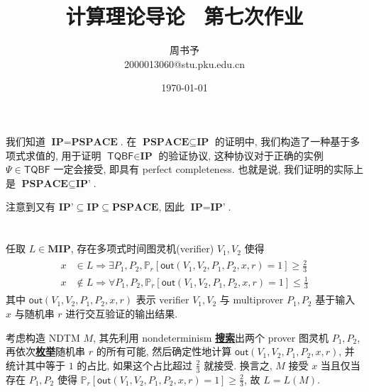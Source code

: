 \documentclass[8pt]{article}
\title{\heiti\zihao{1} 计算理论导论 \ 第七次作业}
\author{\kaishu\zihao{-3} 周书予\\2000013060@stu.pku.edu.cn}
\date{\today}
\theoremstyle{compact}
\def\obj#1{\textbf{\uline{#1}}}
\def\le{\leqslant}
\def\ge{\geqslant}
\begin{document}
\pagestyle{plain}



\maketitle

\def\IP{\textbf{IP}}
\def\IPP{\textbf{IP'}}
\def\PSPACE{\textbf{PSPACE}}

\section{}
我们知道 $\IP = \PSPACE$. 在 $\PSPACE \subseteq \IP$ 的证明中, 我们构造了一种基于多项式求值的, 用于证明 $\textsf{TQBF} \in \IP$ 的验证协议, 这种协议对于正确的实例 $\Psi \in \textsf{TQBF}$ 一定会接受, 即具有 perfect completeness. 也就是说, 我们证明的实际上是 $\PSPACE \subseteq \IPP$.

注意到又有 $\IPP \subseteq \IP \subseteq \PSPACE$, 因此 $\IP = \IPP$.

\def\MIP{\textbf{MIP}}
\def\NEXP{\textbf{NEXP}}

\section{}
任取 $L \in \MIP$, 存在多项式时间图灵机(verifier) $V_1, V_2$ 使得 \begin{align*}
	\begin{split}
		x &\in L \Rightarrow \exists P_1, P_2, \mathbb P_r[\textsf{out}(V_1, V_2, P_1, P_2, x, r) = 1] \ge \frac23 \\
		x &\notin L \Rightarrow \forall P_1, P_2, \mathbb P_r[\textsf{out}(V_1, V_2, P_1, P_2, x, r) = 1] \le \frac13
	\end{split}
\end{align*}
其中 $\textsf{out}(V_1, V_2, P_1, P_2, x, r)$ 表示 verifier $V_1, V_2$ 与 multiprover $P_1, P_2$ 基于输入 $x$ 与随机串 $r$ 进行交互验证的输出结果.

考虑构造 NDTM $M$, 其先利用 nondeterminism \obj{搜索}出两个 prover 图灵机 $P_1, P_2$, 再依次\obj{枚举}随机串 $r$ 的所有可能, 然后确定性地计算 $\textsf{out}(V_1, V_2, P_1, P_2, x, r)$, 并统计其中等于 $1$ 的占比, 如果这个占比超过 $\frac23$ 就接受. 换言之, $M$ 接受 $x$ 当且仅当存在 $P_1, P_2$ 使得 $\mathbb P_r[\textsf{out}(V_1, V_2, P_1, P_2, x, r) = 1] \ge \frac23$, 故 $L = L(M)$.
\end{document}
